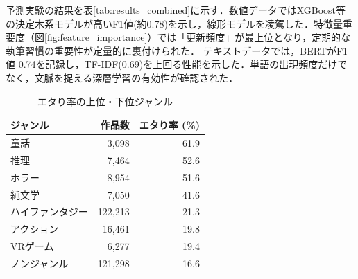 \documentclass[twocolumn,10pt,a4paper]{jsarticle}
\begin{document}
予測実験の結果を表\ref{tab:results_combined}に示す．数値データではXGBoost等の決定木系モデルが高いF1値(約0.78)を示し，線形モデルを凌駕した．特徴量重要度（図\ref{fig:feature_importance}）では「更新頻度」が最上位となり，定期的な執筆習慣の重要性が定量的に裏付けられた．
テキストデータでは，BERTがF1値 0.74を記録し，TF-IDF(0.69)を上回る性能を示した．単語の出現頻度だけでなく，文脈を捉える深層学習の有効性が確認された．

\begin{table}[H]
  \centering
  \vspace{-3mm}
  \caption{エタり率の上位・下位ジャンル}
  \label{tab:genre_extremes}
  \small
  \begin{tabular}{lrr} \hline
   ジャンル & 作品数 & エタり率 (\%) \\ \hline
   童話 & 3,098 & 61.9 \\
   推理 & 7,464 & 52.6 \\
   ホラー & 8,954 & 51.6 \\
   純文学 & 7,050 & 41.6 \\ \hline
   ハイファンタジー & 122,213 & 21.3 \\
   アクション & 16,461 & 19.8 \\
   VRゲーム & 6,277 & 19.4 \\
   ノンジャンル & 121,298 & 16.6 \\ \hline
  \end{tabular}
  \vspace{-5mm}
 \end{table}

\begin{table}[H]
 \centering
 \caption{数値モデル(左)とテキストモデル(右)の性能比較}
 \label{tab:results_combined}
 \small
 \begin{minipage}[t]{0.48\linewidth}
  \centering
 \end{minipage}
 \hfill
 \begin{minipage}[t]{0.48\linewidth}
  \centering
 \end{minipage}
\end{table}
\end{document}
